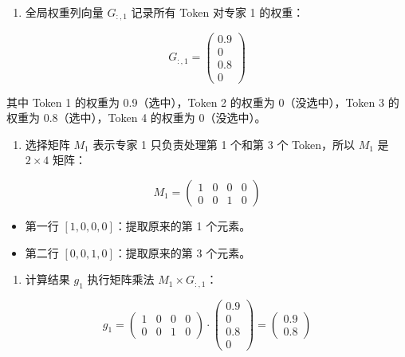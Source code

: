 \begin{enumerate}
\def\labelenumi{\arabic{enumi}.}
\tightlist
\item
{}
  全局权重列向量 \(G_{:,1}\) 记录所有 Token 对专家 1 的权重：
\end{enumerate}

\[
G_{:,1} =
\begin{pmatrix}
0.9 \\
0 \\
0.8 \\
0
\end{pmatrix}
\]

其中 Token 1 的权重为 0.9（选中），Token 2 的权重为 0（没选中），Token 3 的权重为 0.8（选中），Token 4 的权重为 0（没选中）。

\begin{enumerate}
\def\labelenumi{\arabic{enumi}.}
\setcounter{enumi}{1}
\tightlist
\item
{}
  选择矩阵 \(M_1\) 表示专家 1 只负责处理第 1 个和第 3 个 Token，所以 \(M_1\) 是 \(2 \times 4\) 矩阵：
\end{enumerate}

\[
M_1 =
\begin{pmatrix}
1 & 0 & 0 & 0 \\
0 & 0 & 1 & 0
\end{pmatrix}
\]

\begin{itemize}
\tightlist
\item
  第一行 \([1,0,0,0]\)：提取原来的第 1 个元素。
\item
  第二行 \([0,0,1,0]\)：提取原来的第 3 个元素。
\end{itemize}

\begin{enumerate}
\def\labelenumi{\arabic{enumi}.}
\setcounter{enumi}{2}
\tightlist
\item
{}
  计算结果 \(g_1\) 执行矩阵乘法 \(M_1 \times G_{:,1}\)：
\end{enumerate}

\[
g_1 =
\begin{pmatrix}
1 & 0 & 0 & 0 \\
0 & 0 & 1 & 0
\end{pmatrix}
\cdot
\begin{pmatrix}
0.9 \\
0 \\
0.8 \\
0
\end{pmatrix}
=
\begin{pmatrix}
0.9 \\
0.8
\end{pmatrix}
\]


